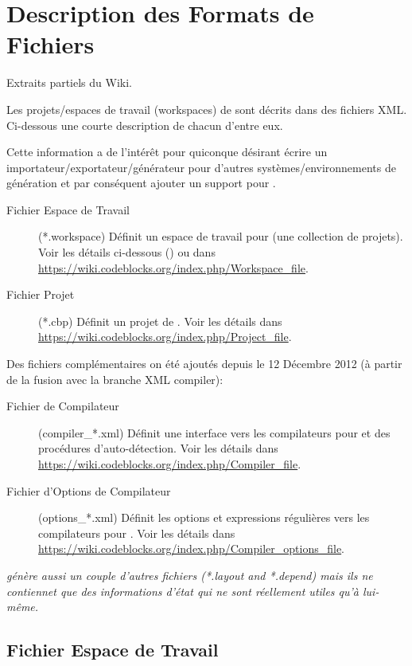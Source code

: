 \section{Description des Formats de Fichiers}\label{sec:file_formats}

Extraits partiels du Wiki.

Les projets/espaces de travail (workspaces) de \codeblocks sont décrits dans des fichiers XML. Ci-dessous une courte description de chacun d'entre eux.

Cette information a de l'intérêt pour quiconque désirant écrire un importateur/exportateur/générateur pour d'autres systèmes/environnements de génération et par conséquent ajouter un support pour \codeblocks.

\begin{description}
\item[Fichier Espace de Travail] (*.workspace) Définit un espace de travail pour \codeblocks (une collection de projets). Voir les détails ci-dessous () ou dans \url{https://wiki.codeblocks.org/index.php/Workspace_file}.
\item[Fichier Projet] (*.cbp) Définit un projet de \codeblocks. Voir les détails dans \url{https://wiki.codeblocks.org/index.php/Project_file}.
\end{description}

Des fichiers complémentaires on été ajoutés depuis le 12 Décembre 2012 (à partir de la fusion avec la branche XML compiler):

\begin{description}
\item[Fichier de Compilateur] (compiler\_*.xml) Définit une interface vers les compilateurs pour \codeblocks et des procédures d'auto-détection. Voir les détails dans \url{https://wiki.codeblocks.org/index.php/Compiler_file}.
\item[Fichier d'Options de Compilateur] (options\_*.xml) Définit les options et expressions régulières vers les compilateurs pour \codeblocks. Voir les détails dans \url{https://wiki.codeblocks.org/index.php/Compiler_options_file}.
\end{description}

\textit{\codeblocks génère aussi un couple d'autres fichiers (*.layout and *.depend) mais ils ne contiennet que des informations d'état qui ne sont réellement utiles qu'à \codeblocks lui-même.}

\subsection*{Fichier Espace de Travail}\label{sec:workspace_file}

